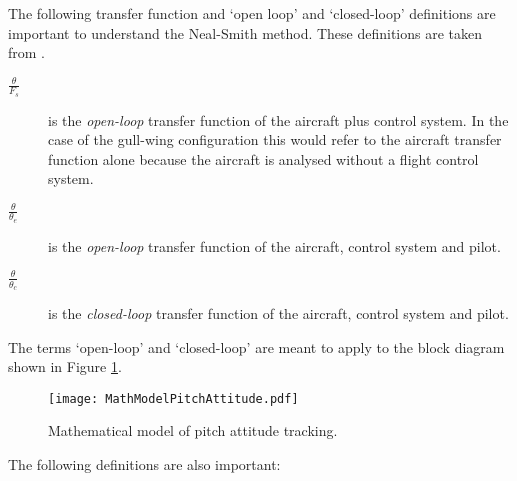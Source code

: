 \documentclass{report}
\begin{document}
The following transfer function and `open loop' and `closed-loop' definitions are important to understand the Neal-Smith method.  These definitions are taken from .

\begin{description}
	\item[$\frac{\theta}{F_s}$]  is the \emph{open-loop} transfer function of the aircraft plus control system.  In the case of the gull-wing configuration this would refer to the aircraft transfer function alone because the aircraft is analysed without a flight control system.
	\item[$\frac{\theta}{\theta_e}$]  is the \emph{open-loop} transfer function of the aircraft, control system and pilot.
	\item[$\frac{\theta}{\theta_c}$]  is the \emph{closed-loop} transfer function of the aircraft, control system and pilot.
\end{description}


The terms `open-loop' and `closed-loop' are meant to apply to the block diagram shown in Figure \ref{Fig: MathModelPitchAttitude}.

\begin{figure}[htb]
	\begin{center}
		\texttt{[image: MathModelPitchAttitude.pdf]}
	\end{center}
	\caption{Mathematical model of pitch attitude tracking.}
	\label{Fig: MathModelPitchAttitude}
\end{figure}

The following definitions are also important:

\end{document}
